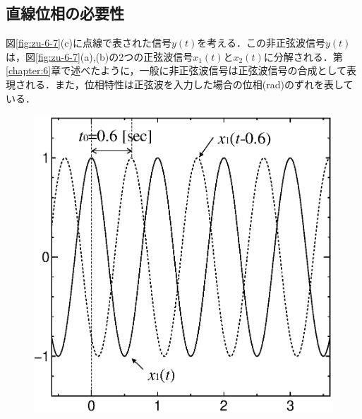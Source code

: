 \subsection{直線位相の必要性}

図\ref{fig:zu-6-7}(c)に点線で表された信号$y(t)$を考える．この非正弦波信号$y(t)$は，図\ref{fig:zu-6-7}(a),(b)の2つの正弦波信号$x_1(t)$と$x_2(t)$に分解される．第\ref{chapter:6}章で述べたように，一般に非正弦波信号は正弦波信号の合成として表現される．また，位相特性は正弦波を入力した場合の位相(rad)のずれを表している．


\begin{figure}[H]
\begin{center}
\begin{minipage}{.35\textwidth}
\begin{center}
\includegraphics[width=.98\textwidth]{fig/zu-6-7-a.eps}


\end{center}
\end{minipage}
\end{center}
\end{figure}

